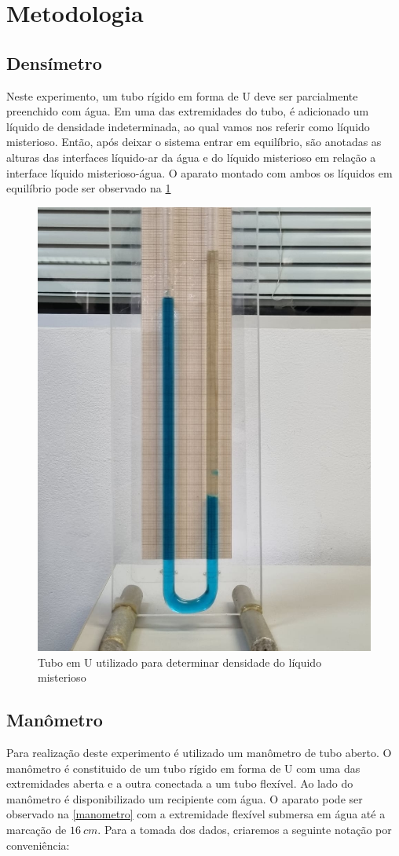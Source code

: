 \section{Metodologia}
\subsection{Densímetro}
    Neste experimento, um tubo rígido em forma de U deve ser parcialmente preenchido com água. Em uma das extremidades do tubo, é adicionado um líquido de densidade indeterminada, ao qual vamos nos referir como líquido misterioso. Então, após deixar o sistema entrar em equilíbrio, são anotadas as alturas das interfaces líquido-ar da água e do líquido misterioso em relação a interface líquido misterioso-água. O aparato montado com ambos os líquidos em equilíbrio pode ser observado na \cref{h2mist} %
    
    \begin{figure}[H]
        \centering
        \includegraphics[width=0.35\linewidth]{fig/liquido_mis.jpeg}
        \caption{Tubo em U utilizado para determinar densidade do líquido misterioso}
        \label{h2mist}
    \end{figure}

\subsection{Manômetro}
    Para realização deste experimento é utilizado um manômetro
    de tubo aberto. O manômetro é constituido de um tubo rígido em forma de U com uma das extremidades aberta e a outra conectada a um tubo flexível. Ao lado do manômetro é disponibilizado um recipiente com água. O aparato pode ser observado na \cref{manometro} com a extremidade flexível submersa em água até a marcação de \(\qty{16}{cm}\). 
    Para a tomada dos dados, criaremos a seguinte notação por conveniência:


